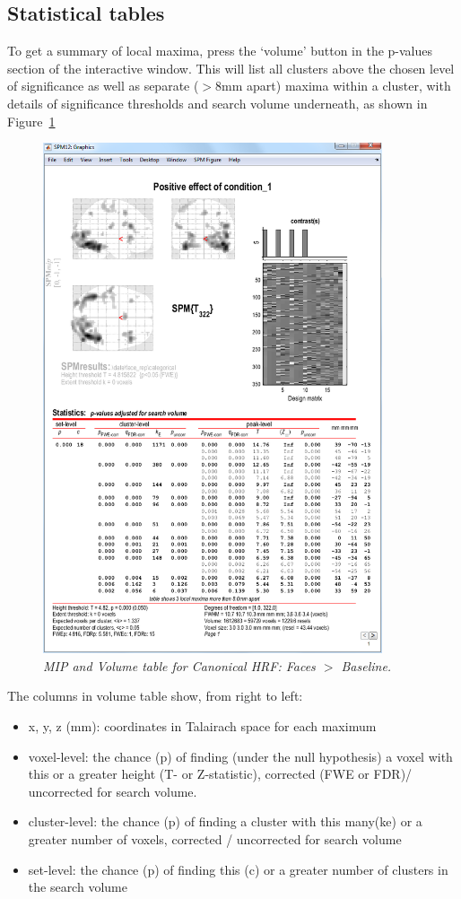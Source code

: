 \documentclass[a4paper,titlepage]{book}
\newcommand{\bi}{\begin{itemize}}
\newcommand{\ei}{\end{itemize}}
\begin{document}
\subsection{Statistical tables}

To get a summary of local maxima, press the `volume' button in the 
p-values section of the interactive window. This will list all clusters above the chosen level of significance as well as separate ($>$8mm apart) maxima within a cluster, with details of significance thresholds and search volume underneath, as shown in Figure~\ref{cat5_volume}
\begin{figure}
\begin{center}
\includegraphics[width=100mm]{cat5_volume}
\caption{\em MIP and Volume table for Canonical HRF: Faces  $>$ Baseline. \label{cat5_volume} }
\end{center}
\end{figure}
The columns in volume table show, from right to left:
\bi
\item{x, y, z (mm): coordinates in Talairach space for each maximum}
\item{voxel-level: the chance (p) of finding (under the null hypothesis) a voxel with this or a greater height (T- or Z-statistic), corrected (FWE or FDR)/ uncorrected for search volume.}
\item{cluster-level: the chance (p) of finding a cluster with this many(ke) or a greater number of voxels, corrected / uncorrected for search volume}
\item{set-level: the chance (p) of finding this (c) or a greater number of clusters in the search volume}
\ei
\end{document}
